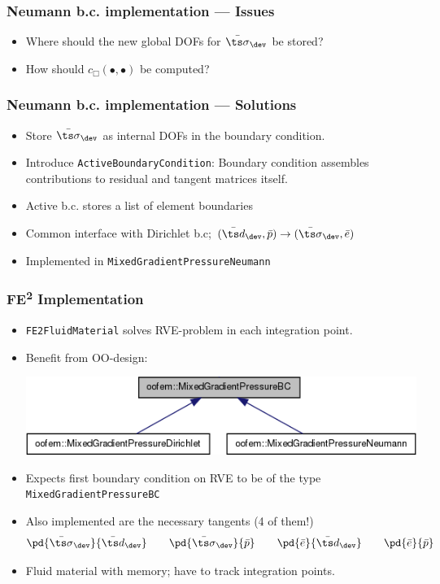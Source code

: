 \documentclass[11pt]{beamer} %
\begin{document}
\begin{frame}
\frametitle{Neumann b.c. implementation --- Issues}
 \begin{itemize}
  \item Where should the new global DOFs for $\bar{\ts\sigma}_\dev$ be stored?
  \item How should $c_\Box(\bullet,\bullet)$ be computed?
 \end{itemize}
\end{frame}
\begin{frame}
\frametitle{Neumann b.c. implementation --- Solutions}
 \begin{itemize}
  \item Store $\bar{\ts\sigma}_{\dev}$ as internal DOFs in the boundary condition.
  \item Introduce \texttt{ActiveBoundaryCondition}: Boundary condition assembles contributions to residual and tangent matrices itself.
  \item Active b.c. stores a list of element boundaries
  \item Common interface with Dirichlet b.c; $(\bar{\ts d}_\dev, \bar{p}) \to (\bar{\ts\sigma}_\dev,\bar{e})$
  \item Implemented in \texttt{MixedGradientPressureNeumann}
 \end{itemize}
\end{frame}

\begin{frame}
 \frametitle{FE\textsuperscript{2} Implementation}
 \begin{itemize}
  \item \texttt{FE2FluidMaterial} solves RVE-problem in each integration point.
  \item Benefit from OO-design:\\
 \begin{center}
 \includegraphics[width=0.7\linewidth]{figures/mixedgradientpressurebc.png}
  \end{center}
  \item Expects first boundary condition on RVE to be of the type \texttt{MixedGradientPressureBC}
  \item Also implemented are the necessary tangents (4 of them!)
  \begin{align*}
   \pd{\bar{\ts\sigma}_\dev}{\bar{\ts d}_\dev} \qquad
   \pd{\bar{\ts\sigma}_\dev}{\bar{p}} \qquad
   \pd{\bar{e}}{\bar{\ts d}_\dev} \qquad
   \pd{\bar{e}}{\bar{p}}
  \end{align*}
 \item Fluid material with memory; have to track integration points.
 \end{itemize}

\end{frame}
\end{document}
